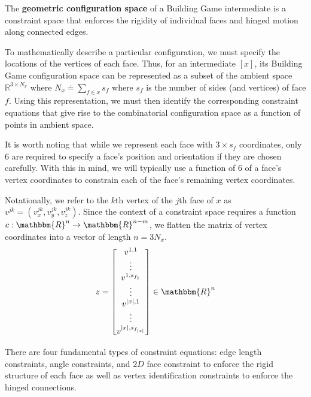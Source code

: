 \begin{mydef}
The \textbf{geometric configuration space} of a Building Game intermediate is a constraint space that enforces the rigidity of individual faces and hinged motion along connected edges.
\end{mydef}

To mathematically describe a particular configuration, we must specify the locations of the vertices of each face. Thus, for an intermediate $[x]$, its Building Game configuration space can be represented as a subset of the ambient space $\mathbb{R}^{3\times N_x}$ where $N_x \doteq \sum_{f\in x} s_f$ where $s_f$ is the number of sides (and vertices) of face $f$. Using this representation, we must then identify the corresponding constraint equations that give rise to the combinatorial configuration space as a function of points in ambient space. 

It is worth noting that while we represent each face with $3\times s_f$ coordinates, only 6 are required to specify a face's position and orientation if they are chosen carefully. With this in mind, we will typically use a function of $6$ of a face's vertex coordinates to constrain each of the face's remaining vertex coordinates. 


Notationally, we refer to the $k$th vertex of the $j$th face of $x$ as $v^{jk} = \left(v^{jk}_x,v^{jk}_y,v^{jk}_z\right)$.
Since the context of a constraint space requires a function $c: \mathbbm{R}^n \to \mathbbm{R}^{n-m}$, we flatten the matrix of vertex coordinates into a vector of length $n = 3N_x$. 
\begin{align}
z = \begin{bmatrix} v^{1,1} \\ \vdots \\ v^{1,s_{f_1}} \\ \vdots \\ v^{|x|,1} \\ \vdots \\ v^{|x|,s_{f_{|x|}}} \end{bmatrix} \in \mathbbm{R}^n
\end{align}

There are four fundamental types of constraint equations: edge length constraints, angle constraints, and $2D$ face constraint to enforce the rigid structure of each face as well as vertex identification constraints to enforce the hinged connections.

